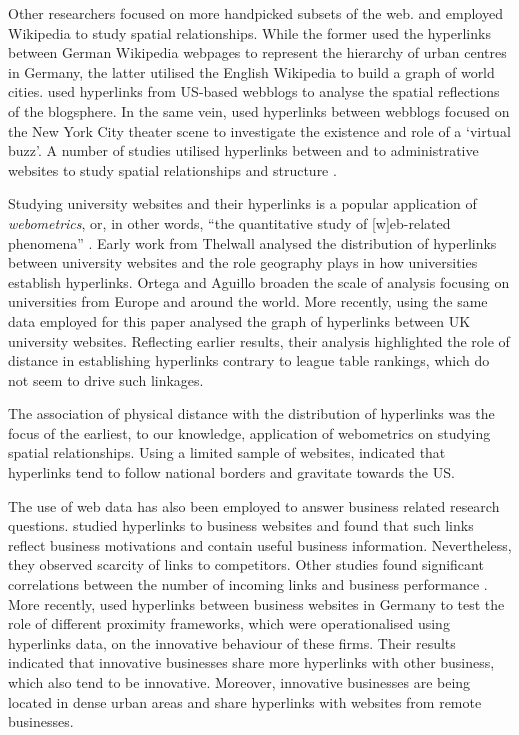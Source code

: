 \documentclass[]{interact}
\theoremstyle{plain}%
\theoremstyle{definition}
\theoremstyle{remark}
\begin{document}
Other researchers focused on more handpicked subsets of the web.
\citet{kessler2017extracting} and \citet{salvini2016spatialization}
employed Wikipedia to study spatial relationships. While the former used
the hyperlinks between German Wikipedia webpages to represent the
hierarchy of urban centres in Germany, the latter utilised the English
Wikipedia to build a graph of world cities. \citet{lin2007blog} used
hyperlinks from US-based webblogs to analyse the spatial reflections of
the blogsphere. In the same vein, \citet{jones2010blog} used hyperlinks
between webblogs focused on the New York City theater scene to
investigate the existence and role of a `virtual buzz'. A number of
studies utilised hyperlinks between and to administrative websites to
study spatial relationships and structure
\citep{holmberg2009local, holmberg2010co, janc2015geography}.

Studying university websites and their hyperlinks is a popular
application of \emph{webometrics}, or, in other words, ``the
quantitative study of {[}w{]}eb-related phenomena''
\citet{thelwall_webometrics}. Early work from Thelwall
\citep{thelwall2002top, thelwall2002evidence} analysed the distribution
of hyperlinks between university websites and the role geography plays
in how universities establish hyperlinks. Ortega and Aguillo
\citetext{\citeyear{ortega2008linking}; \citeyear{ortega2008visualization}; \citeyear{ortega2009mapping}}
broaden the scale of analysis focusing on universities from Europe and
around the world. More recently, \citet{hale2014mapping} using the same
data employed for this paper analysed the graph of hyperlinks between UK
university websites. Reflecting earlier results, their analysis
highlighted the role of distance in establishing hyperlinks contrary to
league table rankings, which do not seem to drive such linkages.

The association of physical distance with the distribution of hyperlinks
was the focus of the earliest, to our knowledge, application of
webometrics on studying spatial relationships. Using a limited sample of
websites, \citet{halavais2000national} indicated that hyperlinks tend to
follow national borders and gravitate towards the US.

The use of web data has also been employed to answer business related
research questions. \citet{vaughan2006hyperlinks} studied hyperlinks to
business websites and found that such links reflect business motivations
and contain useful business information. Nevertheless, they observed
scarcity of links to competitors. Other studies found significant
correlations between the number of incoming links and business
performance \citep{vaughan2004exploring, vaughan2004links}. More
recently, \citet{kruger2020digital} used hyperlinks between business
websites in Germany to test the role of different proximity frameworks,
which were operationalised using hyperlinks data, on the innovative
behaviour of these firms. Their results indicated that innovative
businesses share more hyperlinks with other business, which also tend to
be innovative. Moreover, innovative businesses are being located in
dense urban areas and share hyperlinks with websites from remote
businesses.
\end{document}
